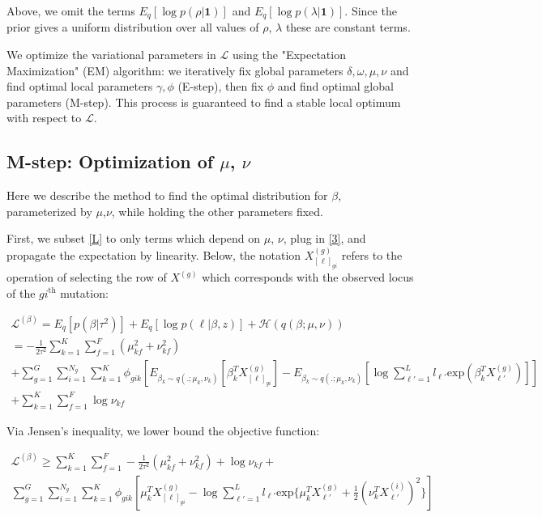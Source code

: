 \documentclass{article}
\newcommand{\Lagr}{\mathcal{L}}
\begin{document}
Above, we omit the terms $E_q[\log p(\rho| \textbf{1})]$ and $E_q[\log p(\lambda| \textbf{1})]$. Since the prior gives a uniform distribution over all values of $\rho$, $\lambda$ these are constant terms.

We optimize the variational parameters in $\Lagr$ using the "Expectation Maximization" (EM) algorithm: we iteratively fix global parameters $\delta, \omega, \mu, \nu$ and find optimal local parameters $\gamma, \phi$ (E-step), then fix $\phi$ and find optimal global parameters (M-step). This process is guaranteed to find a stable local optimum with respect to $\Lagr$.


\subsection{M-step: Optimization of $\mu$, $\nu$}

Here we describe the method to find the optimal distribution for $\beta$, parameterized by $\mu$,$\nu$, while holding the other parameters fixed.

First, we subset \eqref{L} to only terms which depend on $\mu$, $\nu$, plug in \eqref{3}, and propagate the expectation by linearity. Below, the notation $X^{(g)}_{[\ell]_{gi}}$ refers to the operation of selecting the row of $X^{(g)}$ which corresponds with the observed locus of the $gi^\mathrm{th}$ mutation:

\begin{equation}
\begin{split}
\Lagr^{(\beta)} = E_q[p(\beta | \tau^2)] + E_q[\log p(\ell | \beta, z)] + \mathcal{H}(q(\beta;\mu, \nu)) \\
	= -\frac{1}{2\tau^2}\sum_{k=1}^K \sum_{f=1}^F \left( \mu_{kf}^2 + \nu_{kf}^2 \right) \\
	+ \sum_{g=1}^G \sum_{i=1}^{N_g} \sum_{k=1}^K  \phi_{gik} \left[ E_{\beta_k \sim q(.;\mu_k,\nu_k)} [\beta_k^T X^{(g)}_{[\ell]_{gi}}] - E_{\beta_k \sim q(.;\mu_k,\nu_k)} [\log{\sum_{\ell'=1}^L l_{\ell'} \textrm{exp}( \beta_k^T X^{(g)}_{\ell'} )}] \right] \\
	+ \sum_{k=1}^K \sum_{f=1}^F \log \nu_{kf}
\end{split}
\end{equation}

Via Jensen's inequality, we lower bound the objective function:

\begin{equation}
\begin{split}
\Lagr^{(\beta)} \geq \sum_{k=1}^K \sum_{f=1}^F -\frac{1}{2\tau^2}\left(\mu_{kf}^2 + \nu_{kf}^2 \right) + \log \nu_{kf} + \\
	\sum_{g=1}^G \sum_{i=1}^{N_g} \sum_{k=1}^K  \phi_{gik} \left[ \mu_k^T X^{(g)}_{[\ell]_{gi}} - \log{\sum_{\ell'=1}^L l_{\ell'} \textrm{exp}\{ \mu_k^T X^{(g)}_{\ell'} + \frac{1}{2}(\nu_k^T X^{(i)}_{\ell'})^2\}} \right]
\end{split}
\end{equation}
\end{document}
